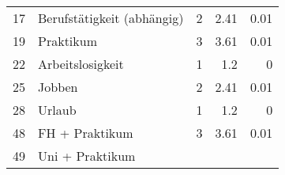 \begin{longtable}{lXrrr}
     17 &
     \multicolumn{1}{X}{ Berufstätigkeit (abhängig)   } &


       \num{2} &
       \num[round-mode=places,round-precision=2]{2,41} &
         \num[round-mode=places,round-precision=2]{0,01} \\

     19 &
     \multicolumn{1}{X}{ Praktikum   } &


       \num{3} &
       \num[round-mode=places,round-precision=2]{3,61} &
         \num[round-mode=places,round-precision=2]{0,01} \\

     22 &
     \multicolumn{1}{X}{ Arbeitslosigkeit   } &


       \num{1} &
       \num[round-mode=places,round-precision=2]{1,2} &
         \num[round-mode=places,round-precision=2]{0} \\

     25 &
     \multicolumn{1}{X}{ Jobben   } &


       \num{2} &
       \num[round-mode=places,round-precision=2]{2,41} &
         \num[round-mode=places,round-precision=2]{0,01} \\

     28 &
     \multicolumn{1}{X}{ Urlaub   } &


       \num{1} &
       \num[round-mode=places,round-precision=2]{1,2} &
         \num[round-mode=places,round-precision=2]{0} \\

     48 &
     \multicolumn{1}{X}{ FH + Praktikum   } &


       \num{3} &
       \num[round-mode=places,round-precision=2]{3,61} &
         \num[round-mode=places,round-precision=2]{0,01} \\

     49 &
     \multicolumn{1}{X}{ Uni + Praktikum   } &



\end{longtable}

